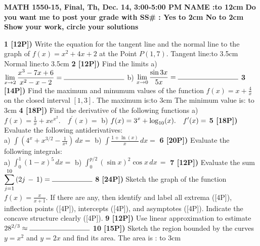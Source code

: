 \documentclass[12pt]{article}
\begin{document}
\begin{center}
{\large\bf MATH 1550-15, Final, Th, Dec. 14, 3:00-5:00 PM}
{\large\bf NAME :\hbox to 12cm{\hrulefill}}
{\bf Do you want me to post your grade with SS\# : Yes \hbox to 2cm{\hrulefill}
No \hbox to 2cm{\hrulefill}
Show your work, circle your solutions
}
\end{center}
{\bf 1 [12P])} Write the equation for the tangent line and the
normal line to the graph of ${\displaystyle f(x) = x^2 + 4 x +2 
}$
at the Point $P(1,7)$. 
Tangent line:\hbox to 3.5cm{\hrulefill}\hfill
Normal line:\hbox to 3.5cm{\hrulefill}\hfill
{\bf 2 [12P])}  Find the limits
a) $\displaystyle{
\lim_{x\to 2}\frac{x^3 - 7x + 6}{x^2-x - 2}=
\hbox  to 3cm{\hrulefill}}$
b) ${\displaystyle \lim_{x\to 0}\frac{\sin 3x}{5x}=
\hbox to 3cm{\hrulefill}}$
{\bf 3 [14P])} Find the maximum and minumum values of
the function 
$\displaystyle{f(x) = x + \frac{4}{x}}$ on the
closed interval $\displaystyle{[1,3]}$.
The maximum is:\hbox to 3cm{\hrulefill}\hspace{1.5cm}\hfill
The minimum value is: \hbox to 3cm{\hrulefill}
\newpage
{\bf 4 [18P])} Find the derivative of the following functions
a) ${\displaystyle f(x) = \frac{1}{x} + xe^{x^2}. \quad f^\prime (x) = }$
b) ${\displaystyle f(x) =  3^x + {\rm log}_{10}(x). \quad
f^\prime (x) = }$
{\bf 5 [18P])}  Evaluate the following antiderivatives:
\\ %
a) 
$\displaystyle{\int \left( 4^x + x^{3/2} - \frac{1}{x^4}
\right)\, dx =}$
b) $\displaystyle{\int \frac{1 + \ln (x)}{x} \, dx=}$
{\bf 6 [20P])} Evaluate the following integrals:
\\ %
a)  $\displaystyle{\int_{0}^1 (1 - x)^5\, dx =}$
b) ${ \int_0^{p /2} (\sin x)^2 \cos x\, dx\, = }$
\newpage
{\bf 7 [12P])} Evaluate the sum $ 
\displaystyle{\sum_{j=1}^{10}\left( 2 j\,  -\, 1\right) =
\hbox  to 2cm{\hrulefill}}$
{\bf 8 [24P])} Sketch the graph of the function
${\displaystyle f(x) = \frac{x}{x+1}}$. If there are any, then identify and label all
extrema ([4P]), inflection points ([4P]), intercepts
([4P]), and asymptotes ([4P]). Indicate the concave structure
clearly ([4P]).
{\bf 9 [12P])}
Use linear approximation to estimate
$\displaystyle{28^{2/3}\approx\hbox  to 3cm{\hrulefill} }$
{\bf 10 [15P])} Sketch the region bounded by the curves
$\displaystyle{y=x^2}$ and ${\displaystyle y =  2x}$ and find its area.
The area is : \hbox  to 3cm{\hrulefill}
\end{document}
